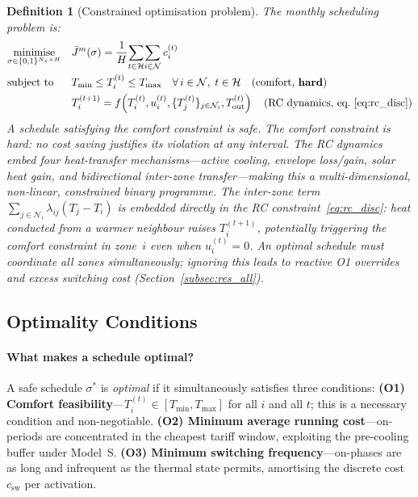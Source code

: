 \documentclass[12pt,a4paper]{article}
\let\oldsubsection\subsection
\renewcommand{\subsection}[1]{\FloatBarrier\oldsubsection{#1}}
\newtheorem{definition}{Definition}
\newcommand{\sched}{\sigma}
\newcommand{\Tmin}{T_{\min}}
\newcommand{\Tmax}{T_{\max}}
\newcommand{\Tout}{T_{\mathrm{out}}}
\newcommand{\lij}{\lambda_{ij}}
\newcommand{\csw}{c_{\mathrm{sw}}}
\newcommand{\Jbar}{\bar{J}}
\begin{document}
\begin{definition}[Constrained optimisation problem]
\label{def:cop}
The monthly scheduling problem is:
\begin{equation}
\begin{aligned}
  &\underset{\sched\in\{0,1\}^{N_z\times H}}{\text{minimise}}&&
  \Jbar^m(\sched)=\frac{1}{H}
  \!\sum_{t\in\mathcal{H}}\!\sum_{i\in\mathcal{N}} c_i^{(t)}\\
  &\text{subject to}&&
  \Tmin \le T_i^{(t)} \le \Tmax \quad\forall\,i\in\mathcal{N},\;
    t\in\mathcal{H} \quad\text{(comfort, \textbf{hard})}\\
  &&&T_i^{(t+1)}=f\!\left(T_i^{(t)},u_i^{(t)},
    \{T_j^{(t)}\}_{j\in\mathcal{N}_i},\Tout^{(t)}\right)
    \quad\text{(RC dynamics, eq.~\eqref{eq:rc_disc})}
\end{aligned}
\label{eq:cop}
\end{equation}
A schedule satisfying the comfort constraint is \emph{safe}.
The comfort constraint is \emph{hard}: no cost saving justifies its
violation at any interval.
The RC dynamics embed four heat-transfer mechanisms---active cooling,
envelope loss/gain, solar heat gain, and bidirectional inter-zone transfer---making this a
multi-dimensional, non-linear, constrained binary programme.
The inter-zone term $\sum_{j\in\mathcal{N}_i}\lij(T_j-T_i)$ is embedded directly
in the RC constraint~\eqref{eq:rc_disc}: heat conducted from a warmer neighbour raises
$T_i^{(t+1)}$, potentially triggering the comfort constraint in zone~$i$ even when
$u_i^{(t)}=0$.
An optimal schedule must coordinate all zones simultaneously; ignoring this
leads to reactive O1 overrides and excess switching cost
(Section~\ref{subsec:res_all}).
\end{definition}

\subsection{Optimality Conditions}
\label{subsec:optcond}

\paragraph{What makes a schedule optimal?}
A safe schedule $\sched^*$ is \emph{optimal} if it simultaneously
satisfies three conditions:
\textbf{(O1) Comfort feasibility}---$T_i^{(t)}\in[\Tmin,\Tmax]$
for all $i$ and all $t$; this is a necessary condition and non-negotiable.
\textbf{(O2) Minimum average running cost}---on-periods are concentrated
in the cheapest tariff window, exploiting the pre-cooling buffer under
Model~S.
\textbf{(O3) Minimum switching frequency}---on-phases are as long and
infrequent as the thermal state permits, amortising the discrete cost
$\csw$ per activation.
\end{document}
